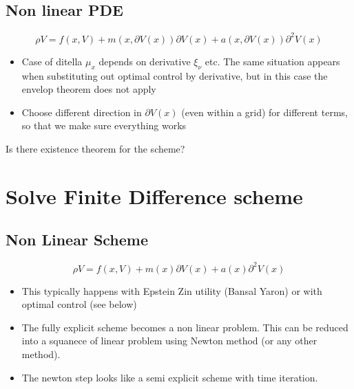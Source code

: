 \documentclass[english]{article}
\begin{document}
\subsection{Non linear PDE}
$$\rho V = f(x, V) + m(x, \partial V(x)) \partial V(x)+ a(x, \partial V(x)) \partial^2 V(x)$$

\begin{itemize}
	\item Case of ditella $\mu_x$ depends on derivative $\xi_\nu$ etc. The same situation appears when substituting out optimal control by derivative, but in this case the envelop theorem does not apply
	\item Choose different direction in $\partial V(x)$ (even within a grid) for different terms, so that we make sure everything works
\end{itemize}

Is there existence theorem for the scheme?
\section{Solve Finite Difference scheme}

\subsection{Non Linear Scheme}
$$\rho V = f(x, V) + m(x) \partial V(x) + a(x) \partial^2 V(x)$$

\begin{itemize}
	\item This typically happens  with Epstein Zin utility (Bansal Yaron) or with optimal control (see below)
	\item The fully explicit scheme becomes a non linear problem. This can be reduced into a squanece of linear problem using Newton method (or any other method). 
	\item The newton step looks like a semi explicit scheme with time iteration. 
\end{itemize}
\end{document}

